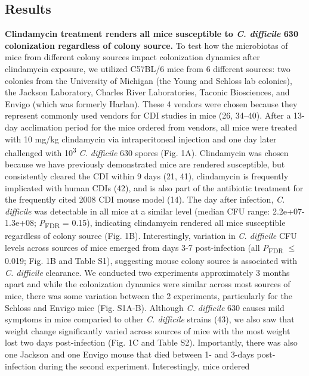 \documentclass[11pt,]{article}
\begin{document}
\subsection{Results}\label{results}

\textbf{Clindamycin treatment renders all mice susceptible to \emph{C.
difficile} 630 colonization regardless of colony source.} To test how
the microbiotas of mice from different colony sources impact
colonization dynamics after clindamycin exposure, we utilized C57BL/6
mice from 6 different sources: two colonies from the University of
Michigan (the Young and Schloss lab colonies), the Jackson Laboratory,
Charles River Laboratories, Taconic Biosciences, and Envigo (which was
formerly Harlan). These 4 vendors were chosen because they represent
commonly used vendors for CDI studies in mice (26, 34--40). After a
13-day acclimation period for the mice ordered from vendors, all mice
were treated with 10 mg/kg clindamycin via intraperitoneal injection and
one day later challenged with 10\textsuperscript{3} \emph{C. difficile}
630 spores (Fig. 1A). Clindamycin was chosen because we have previously
demonstrated mice are rendered susceptible, but consistently cleared the
CDI within 9 days (21, 41), clindamycin is frequently implicated with
human CDIs (42), and is also part of the antibiotic treatment for the
frequently cited 2008 CDI mouse model (14). The day after infection,
\emph{C. difficile} was detectable in all mice at a similar level
(median CFU range: 2.2e+07-1.3e+08; \emph{P}\textsubscript{FDR} = 0.15),
indicating clindamycin rendered all mice susceptible regardless of
colony source (Fig. 1B). Interestingly, variation in \emph{C. difficile}
CFU levels across sources of mice emerged from days 3-7 post-infection
(all \emph{P}\textsubscript{FDR} \(\le\) 0.019; Fig. 1B and Table S1),
suggesting mouse colony source is associated with \emph{C. difficile}
clearance. We conducted two experiments approximately 3 months apart and
while the colonization dynamics were similar across most sources of
mice, there was some variation between the 2 experiments, particularly
for the Schloss and Envigo mice (Fig. S1A-B). Although \emph{C.
difficile} 630 causes mild symptoms in mice comparied to other \emph{C.
difficile} strains (43), we also saw that weight change significantly
varied across sources of mice with the most weight lost two days
post-infection (Fig. 1C and Table S2). Importantly, there was also one
Jackson and one Envigo mouse that died between 1- and 3-days
post-infection during the second experiment. Interestingly, mice ordered
\end{document}
